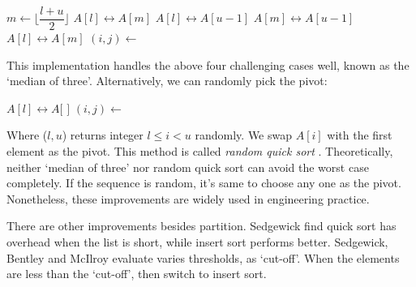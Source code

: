 \documentclass[b5paper]{article}
\begin{document}
\begin{algorithmic}[1]
    \State $m \gets \lfloor \dfrac{l + u}{2} \rfloor$ 
     
      \State {} $A[l] \leftrightarrow A[m]$
    \EndIf
     
      \State {} $A[l] \leftrightarrow A[u-1]$
    \EndIf
     
      \State {} $A[m] \leftrightarrow A[u-1]$
    \EndIf
    \State {} $A[l] \leftrightarrow A[m]$
    \State $(i, j) \gets $ 
    \State {}
    \State {}
  \EndIf
\EndProcedure
\end{algorithmic}

This implementation handles the above four challenging cases well, known as the `median of three'. Alternatively, we can randomly pick the pivot:

\begin{algorithmic}[1]
    \State {} $A[l] \leftrightarrow A[$  $]$
    \State $(i, j) \gets $ 
    \State {}
    \State {}
  \EndIf
\EndProcedure
\end{algorithmic}

Where ($l, u$) returns integer $l \leq i < u$ randomly. We swap $A[i]$ with the first element as the pivot. This method is called {\em random quick sort} \cite{CLRS}. Theoretically, neither `median of three' nor random quick sort can avoid the worst case completely. If the sequence is random, it's same to choose any one as the pivot. Nonetheless, these improvements are widely used in engineering practice.

There are other improvements besides partition. Sedgewick find quick sort has overhead when the list is short, while insert sort performs better\cite{Bentley}\cite{3-way-part}. Sedgewick, Bentley and McIlroy evaluate varies thresholds, as `cut-off'. When the elements are less than the `cut-off', then switch to insert sort.

\begin{algorithmic}[1]
    \State {}
  \Else
    \State {}
  \EndIf
\EndProcedure
\end{algorithmic}
\end{document}
